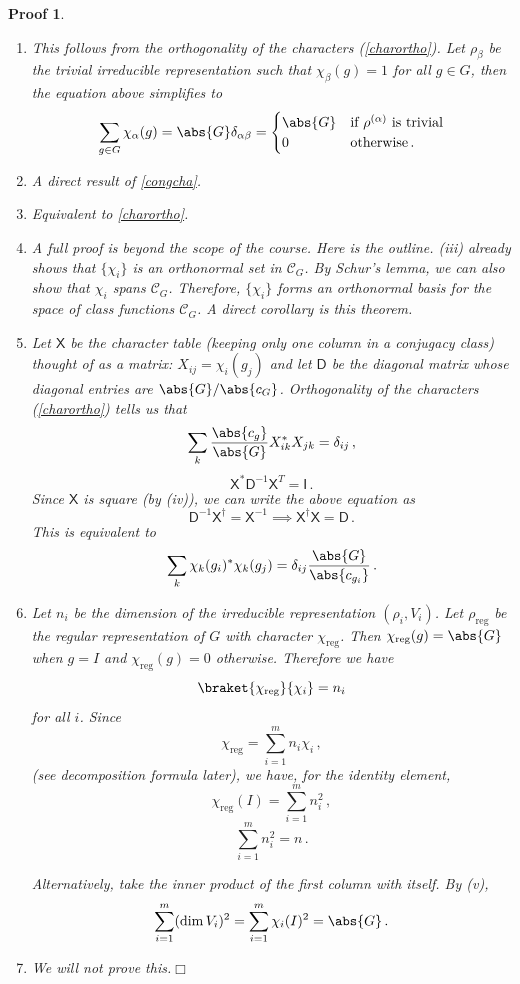 \documentclass{article}
\theoremstyle{plain}\theoremheaderfont{\normalfont\itshape}\theorembodyfont{\rmfamily}\theoremseparator{.}\newtheorem*{rem}{Remark}\newtheorem*{ex}{Example}\newtheorem*{proof}{Proof}\newtheorem*{altp}{Alternative proof}
\theoremstyle{plain}\theoremheaderfont{\normalfont\bfseries}\theorembodyfont{\rmfamily}\theoremseparator{.}\newtheorem{thm}{Theorem}[section]\newtheorem{lem}[thm]{Lemma}\newtheorem{prop}[thm]{Proposition}\newtheorem*{cor}{Corollary}\newtheorem{defn}[thm]{Definition}\newtheorem{clm}[thm]{Claim}\newtheorem{clminproof}{Claim}
\theoremstyle{break}\theoremheaderfont{\normalfont\itshape}\theorembodyfont{\rmfamily}\theoremseparator{.\medskip}\newtheorem*{proofskip}{Proof}\newtheorem*{exs}{Examples}\newtheorem*{rems}{Remarks}
\theoremstyle{break}\theoremheaderfont{\normalfont\bfseries}\theorembodyfont{\rmfamily}\theoremseparator{.\medskip}\newtheorem{lemskip}[thm]{Lemma}\newtheorem{defnskip}[thm]{Definition}\newtheorem{propskip}[thm]{Proposition}\newtheorem{thmskip}[thm]{Theorem}
\numberwithin{equation}{section}
\newcommand{\qed}{\hfill\ensuremath{\Box}}
\begin{document}
	\begin{proofskip}
		\begin{enumerate}[topsep=0pt]
			\item[(i)] This follows from the orthogonality of the characters (\cref{charortho}). Let \(\rho_\beta\) be the trivial irreducible representation such that \(\chi_\beta(g)=1\) for all \(g\in G\), then the equation above simplifies to
			\[\sum_{g\in G}\chi_\alpha(g)=\abs{G}\delta_{\alpha\beta}=\begin{cases}
				\abs{G} & \text{if } \rho^{(\alpha)} \text{ is trivial}\\
				0 & \text{otherwise}\,.
			\end{cases}\]
			\item[(ii)] A direct result of \cref{congcha}.
			\item[(iii)] Equivalent to \cref{charortho}.
			\item[(iv)] A full proof is beyond the scope of the course. Here is the outline. (iii) already shows that \(\{\chi_i\}\) is an orthonormal set in \(\mathcal{C}_G\). By Schur's lemma, we can also show that \(\chi_i\) spans \(\mathcal{C}_G\). Therefore, \(\{\chi_i\}\) forms an orthonormal basis for the space of class functions \(\mathcal{C}_G\). A direct corollary is this theorem.
			\item[(v)] Let \(\mathsf{X}\) be the character table (keeping only one column in a conjugacy class) thought of as a matrix: \(X_{ij}=\chi_i(g_j)\) and let \(\mathsf{D}\) be the diagonal matrix whose diagonal entries are \(\abs{G}/\abs{c_G}\). Orthogonality of the characters (\cref{charortho}) tells us that
			\[\sum_k\frac{\abs{c_g}}{\abs{G}}X_{ik}^*X_{jk}=\delta_{ij}\,,\]
			\[\mathsf{X}^*\mathsf{D}^{-1}\mathsf{X}^T=\mathsf{I}\,.\]
			Since \(\mathsf{X}\) is square (by (iv)), we can write the above equation as
			\[\mathsf{D}^{-1}\mathsf{X}^\dagger=\mathsf{X}^{-1}\implies\mathsf{X}^\dagger\mathsf{X}=\mathsf{D}\,.\]
			This is equivalent to
			\[\sum_k\chi_k(g_i)^*\chi_k(g_j)=\delta_{ij}\frac{\abs{G}}{\abs{c_{g_i}}}\,.\]
			\item[(vi)] Let \(n_i\) be the dimension of the irreducible representation \((\rho_i,V_i)\). Let \(\rho_\text{reg}\) be the regular representation of \(G\) with character \(\chi_\text{reg}\). Then \(\chi_\text{reg}(g)=\abs{G}\) when \(g=I\) and \(\chi_\text{reg}(g)=0\) otherwise. Therefore we have
			\[\braket{\chi_\text{reg}}{\chi_i}=n_i\]
			for all \(i\). Since
			\[\chi_\text{reg}=\sum_{i=1}^{m}n_i\chi_i\,,\]
			(see decomposition formula later), we have, for the identity element,
			\[\chi_\text{reg}(I)=\sum_{i=1}^{m}n_i^2\,,\]
			\[\sum_{i=1}^{m}n_i^2=n\,.\]

			Alternatively, take the inner product of the first column with itself. By (v),
			\[\sum_{i=1}^{m}(\dim V_i)^2=\sum_{i=1}^{m}\chi_i(I)^2=\abs{G}\,.\]
			\item[(vii)] We will not prove this.\qed
		\end{enumerate}
	\end{proofskip}
\end{document}
